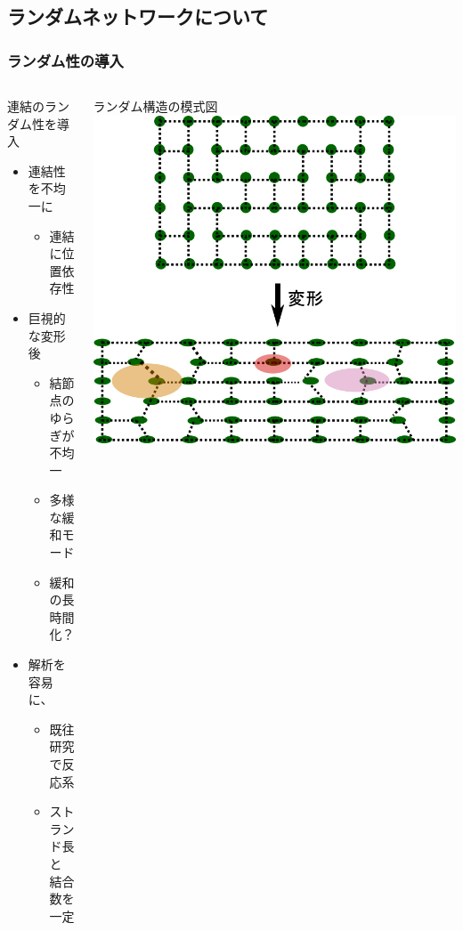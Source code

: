 \documentclass[12pt, dvipdfmx]{beamer}
\begin{document}
\subsection{ランダムネットワークについて}
\begin{frame}
    \frametitle{ランダム性の導入}
    \vspace{-3mm}
		\begin{columns}[totalwidth=1\textwidth]
				\begin{block}{連結のランダム性を導入}
					\begin{itemize}
						\item 連結性を不均一に
							\begin{itemize}
								\item 連結に\alert{位置依存性}
							\end{itemize}
						\item 巨視的な変形後
							\begin{itemize}
								\item 結節点のゆらぎが\\不均一
								\item 多様な緩和モード
								\item \alert{緩和の長時間化？}
							\end{itemize}
						\item \alert{解析を容易}に、
                            \begin{itemize}
                                \item 既往研究で反応系
								\item \alert{ストランド長と\\結合数を一定}
							\end{itemize}
					\end{itemize}
				\end{block}
				ランダム構造の模式図
				\vspace{5mm}
				\includegraphics[width=\textwidth]{random_NW.png}

\end{columns}
\end{frame}
\end{document}
